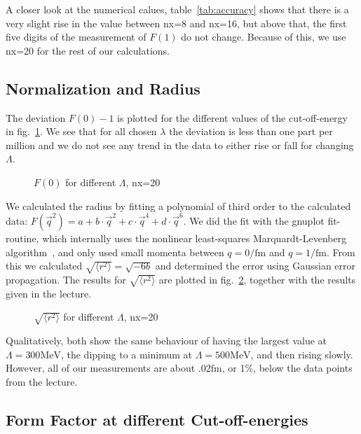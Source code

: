 \documentclass{scrartcl}
\begin{document}
A closer look at the numerical calues, table~\ref{tab:accuracy} shows that there is a very slight rise in the value between nx=8 and nx=16, but above that, the first five digits of the measurement of $F(1)$ do not change. Because of this, we use nx=20 for the rest of our calculations.

\subsection{Normalization and Radius}
The deviation $F(0)-1$ is plotted for the different values of the cut-off-energy in fig.~\ref{fig:fofzero}. We see that for all chosen $\lambda$ the deviation is less than one part per million and we do not see any trend in the data to either rise or fall for changing $\Lambda$.
  
  
\begin{figure}[htbp]
	
	\caption{$F(0)$ for different $\Lambda$, nx=20}
	\label{fig:fofzero}
\end{figure}

We calculated the radius by fitting a polynomial of third order to the calculated data: $F(\vec{q}^2)=a+b\cdot \vec{q}^2+c\cdot\vec{q}^4+d\cdot\vec{q}^6$. We did the fit with the gnuplot fit-routine, which internally uses the nonlinear least-squares Marquardt-Levenberg algorithm~\cite[p. 74]{gnuplotdoc}, and only used small momenta between $q=0\si{\per\femto\meter}$ and $q=1\si{\per\femto\meter}$. From this we calculated $\sqrt{\langle r^2\rangle}=\sqrt{-6b}$ and determined the error using Gaussian error propagation. The results for $\sqrt{\langle r^2\rangle}$ are plotted in fig.~\ref{fig:radius}, together with the results given in the lecture.

\begin{figure}[htbp]
	
	\caption{$\sqrt{\langle r^2\rangle}$ for different $\Lambda$, nx=20}
	\label{fig:radius}
\end{figure}

Qualitatively, both show the same behaviour of having the largest value at $\Lambda=300\si{\mega\electronvolt}$, the dipping to a minimum at $\Lambda=500\si{\mega\electronvolt}$, and then rising slowly. However, all of our measurements are about $.02\si{\femto\meter}$, or 1\%, below the data points from the lecture.

\subsection{Form Factor at different Cut-off-energies}
\end{document}
